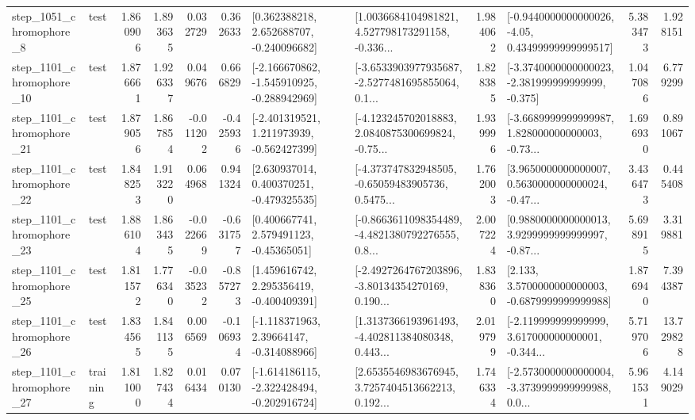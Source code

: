 \begin{tabular}{llrrrrllrlrr}
  step\_1051\_chromophore\_8 &      test &      1.860906 &    1.893635 &      0.032729 &  0.362633 &    [0.362388218, 2.652688707, -0.240096682] &  [1.0036684104981821, 4.527798173291158, -0.336... &       1.984062 &  [-0.9440000000000026, -4.05, 0.43499999999999517] &            5.383473 &          1.928151 \\
 step\_1101\_chromophore\_10 &      test &      1.876661 &    1.926337 &      0.049676 &  0.666829 &  [-2.166670862, -1.545910925, -0.288942969] &  [-3.6533903977935687, -2.5277481695855064, 0.1... &       1.828385 &  [-3.3740000000000023, -2.381999999999999, -0.375] &            1.047086 &          6.779299 \\
 step\_1101\_chromophore\_21 &      test &      1.879056 &    1.867854 &     -0.011202 & -0.425936 &   [-2.401319521, 1.211973939, -0.562427399] &  [-4.123245702018883, 2.0840875300699824, -0.75... &       1.939996 &  [-3.6689999999999987, 1.828000000000003, -0.73... &            1.696930 &          0.891067 \\
 step\_1101\_chromophore\_22 &      test &      1.848253 &    1.913220 &      0.064968 &  0.941324 &    [2.630937014, 0.400370251, -0.479325535] &  [-4.373747832948505, -0.65059483905736, 0.5475... &       1.762003 &  [3.9650000000000007, 0.5630000000000024, -0.47... &            3.436473 &          0.445408 \\
 step\_1101\_chromophore\_23 &      test &      1.886104 &    1.863435 &     -0.022669 & -0.631757 &     [0.400667741, 2.579491123, -0.45365051] &  [-0.8663611098354489, -4.4821380792276555, 0.8... &       2.007224 &  [0.9880000000000013, 3.9299999999999997, -0.87... &            5.698915 &          3.319881 \\
 step\_1101\_chromophore\_25 &      test &      1.811572 &    1.776340 &     -0.035232 & -0.857273 &    [1.459616742, 2.295356419, -0.400409391] &  [-2.4927264767203896, -3.80134354270169, 0.190... &       1.838360 &   [2.133, 3.5700000000000003, -0.6879999999999988] &            1.876940 &          7.394387 \\
 step\_1101\_chromophore\_26 &      test &      1.834565 &    1.841135 &      0.006569 & -0.106934 &    [-1.118371963, 2.39664147, -0.314088966] &  [1.3137366193961493, -4.402811384080348, 0.443... &       2.019799 &  [-2.119999999999999, 3.617000000000001, -0.344... &            5.719706 &         13.729828 \\
 step\_1101\_chromophore\_27 &  training &      1.811000 &    1.827434 &      0.016434 &  0.070130 &  [-1.614186115, -2.322428494, -0.202916724] &  [2.6535546983676945, 3.7257404513662213, 0.192... &       1.746334 &  [-2.5730000000000004, -3.3739999999999988, 0.0... &            5.961531 &          4.149029 \\

\end{tabular}
